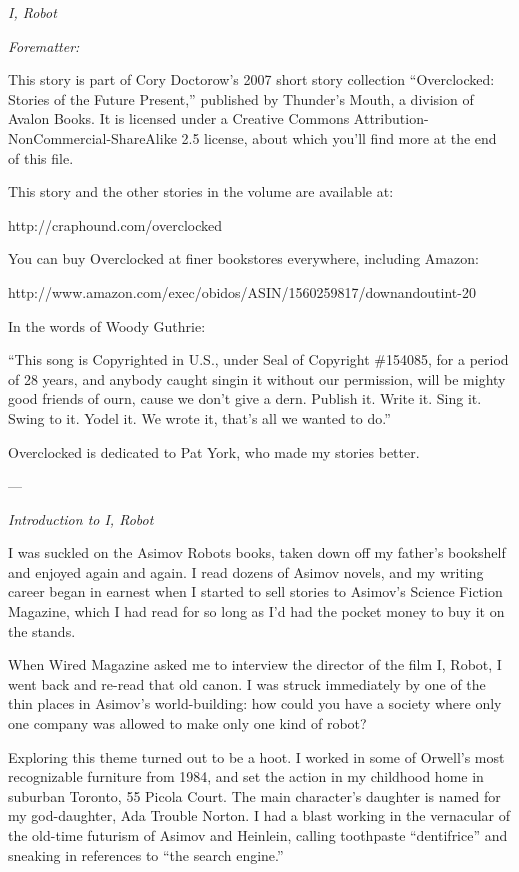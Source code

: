 \emph{I, Robot}

\emph{Forematter:}

This story is part of Cory Doctorow’s 2007 short story collection
“Overclocked: Stories of the Future Present,” published by
Thunder’s Mouth, a division of Avalon Books. It is licensed under a
Creative Commons Attribution-NonCommercial-ShareAlike 2.5 license,
about which you’ll find more at the end of this file.

This story and the other stories in the volume are available at:

http://craphound.com/overclocked

You can buy Overclocked at finer bookstores everywhere, including
Amazon:

http://www.amazon.com/exec/obidos/ASIN/1560259817/downandoutint-20

In the words of Woody Guthrie:

“This song is Copyrighted in U.S., under Seal of Copyright
\#154085, for a period of 28 years, and anybody caught singin it
without our permission, will be mighty good friends of ourn, cause
we don’t give a dern. Publish it. Write it. Sing it. Swing to it.
Yodel it. We wrote it, that’s all we wanted to do.”

Overclocked is dedicated to Pat York, who made my stories better.

—

\emph{Introduction to I, Robot}

I was suckled on the Asimov Robots books, taken down off my
father’s bookshelf and enjoyed again and again. I read dozens of
Asimov novels, and my writing career began in earnest when I
started to sell stories to Asimov’s Science Fiction Magazine, which
I had read for so long as I’d had the pocket money to buy it on the
stands.

When Wired Magazine asked me to interview the director of the film
I, Robot, I went back and re-read that old canon. I was struck
immediately by one of the thin places in Asimov’s world-building:
how could you have a society where only one company was allowed to
make only one kind of robot?

Exploring this theme turned out to be a hoot. I worked in some of
Orwell’s most recognizable furniture from 1984, and set the action
in my childhood home in suburban Toronto, 55 Picola Court. The main
character’s daughter is named for my god-daughter, Ada Trouble
Norton. I had a blast working in the vernacular of the old-time
futurism of Asimov and Heinlein, calling toothpaste “dentifrice”
and sneaking in references to “the search engine.”

